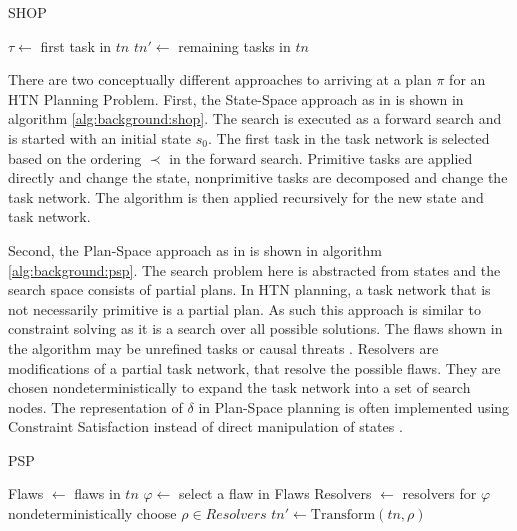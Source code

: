 \begin{algorithm}[t]
  \caption{SHOP}
  \label{alg:background:shop}
  \KwOut{$\pi$}
  $\tau \leftarrow$ first task in $tn$\;
  $tn' \leftarrow$ remaining tasks in $tn$\;
\end{algorithm}

There are two conceptually different approaches to arriving at a plan $\pi$ for an HTN Planning Problem. 
First, the State-Space approach as in \cite{nauSHOPSimpleHierarchical1999} is shown in algorithm \ref{alg:background:shop}.
The search is executed as a forward search and is started with an initial state $s_0$.
The first task in the task network is selected based on the ordering $\prec$ in the forward search.
Primitive tasks are applied directly and change the state, nonprimitive tasks are decomposed and change the task network.
The algorithm is then applied recursively for the new state and task network.

Second, the Plan-Space approach as in \citet[chap.~5]{ghallabAutomatedPlanningTheory2004} is shown in algorithm \ref{alg:background:psp}.
The search problem here is abstracted from states and the search space consists of partial plans.
In HTN planning, a task network that is not necessarily primitive is a partial plan.
As such this approach is similar to constraint solving as it is a search over all possible solutions.
The flaws shown in the algorithm may be unrefined tasks or causal threats .
Resolvers are modifications of a partial task network, that resolve the possible flaws.
They are chosen nondeterministically to expand the task network into a set of search nodes.
The representation of $\delta$ in Plan-Space planning is often implemented using Constraint Satisfaction instead of direct manipulation of states \citep{georgievskiHTNPlanningOverview2015}.

\begin{algorithm}[t]
  \caption{PSP}
  \label{alg:background:psp}
  \KwOut{$\pi$}
  Flaws $\leftarrow$ flaws in $tn$\;
  $\varphi \leftarrow$ select a flaw in Flaws\;
  Resolvers $\leftarrow$ resolvers for $\varphi$\;
  nondeterministically choose $\rho \in Resolvers$\;
  $tn' \leftarrow \text{Transform}(tn, \rho)$\;
\end{algorithm}



